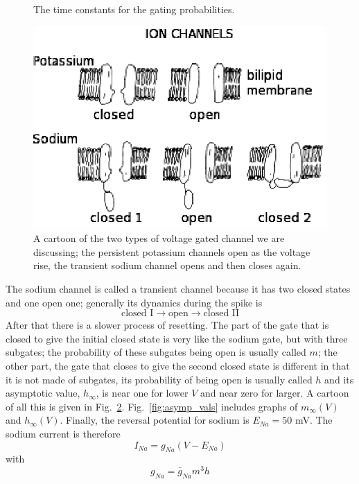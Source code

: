 \documentclass[11pt,a4paper]{scrartcl}
\begin{document}
\begin{figure}
\begin{center}

\end{center}
\caption{The time constants for the gating probabilities.\label{fig:tau_vals}}
\end{figure}


\begin{figure}
\begin{center}
\includegraphics{ChannelsBlack.eps}
\end{center}
\caption{A cartoon of the two types of voltage gated channel we are
  discussing; the persistent potassium channels open as the voltage
  rise, the transient sodium channel opens and then closes
  again.\label{ChannelsBlack}}
\end{figure}



The sodium channel is called a transient channel because it has two
closed states and one open one; generally its dynamics during the
spike is
\begin{equation}
\mbox{closed I}\rightarrow \mbox{open}\rightarrow\mbox{closed II}
\end{equation}
After that there is a slower process of resetting. The part of the
gate that is closed to give the initial closed state is very like the
sodium gate, but with three subgates; the probability of these
subgates being open is usually called $m$; the other part, the gate
that closes to give the second closed state is different in that it is
not made of subgates, its probability of being open is usually called
$h$ and its asymptotic value, $h_\infty$, is near one for lower $V$
and near zero for larger. A cartoon of all this is given in Fig.~\ref{ChannelsBlack}. Fig.~\ref{fig:asymp_vals} includes graphs of $m_\infty(V)$
and $h_\infty(V)$. Finally, the reversal potential for sodium is
$E_{Na}=50$ mV. The sodium current is therefore
\begin{equation}
I_{Na}=g_{Na}(V-E_{Na})
\end{equation}
with
\begin{equation}
g_{Na}=\bar{g}_{Na}m^3h
\end{equation}
\end{document}
